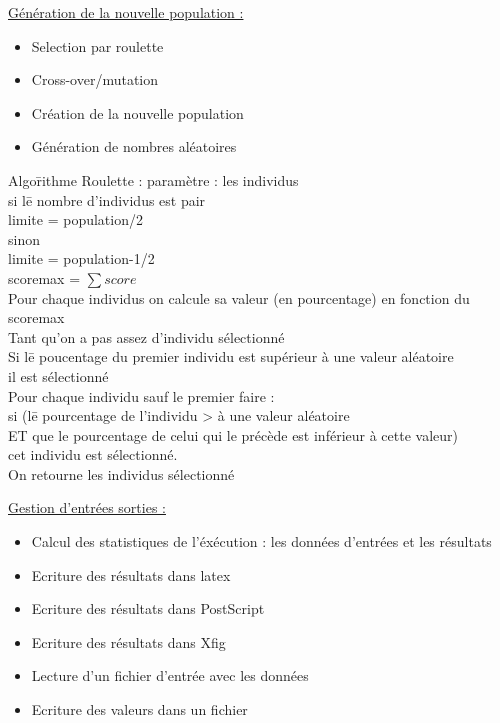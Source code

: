 \documentclass[a4paper,11pt]{article}
\begin{document}
		\underline{Génération de la nouvelle population : }
		\begin{itemize}
			\item Selection par roulette
			\item Cross-over/mutation
			\item Création de la nouvelle population
			\item Génération de nombres aléatoires
		\end{itemize}
		\begin{tabbing} 
		Algo\=rithme Roulette : paramètre : les individus\\
			\>si l\=e nombre d’individus est pair\\
			\>	\>limite = population/2\\
			\>sinon\\
			\>	\>limite = population-1/2\\
			\>scoremax = $\sum score$\\
			\>Pour chaque individus on calcule sa valeur (en pourcentage) en fonction du scoremax\\
			\>Tant qu’on a pas assez d’individu sélectionné\\
			\>	\>Si l\=e poucentage du premier individu est supérieur à une valeur aléatoire\\
			\>	\>\>il est sélectionné\\
			\>	\>Pour chaque individu sauf le premier faire :\\
			\>	\>\>si (l\=e pourcentage de l'individu > à une valeur aléatoire\\ 
			\>	\>\>ET que le pourcentage de celui qui le précède est inférieur à cette valeur)\\
			\>	\>\>\>cet individu est sélectionné.\\
			\>On retourne les individus sélectionné
		\end{tabbing}

		\underline{Gestion d'entrées sorties : }
		\begin{itemize}
			\item Calcul des statistiques de l'éxécution : les données d'entrées et les résultats
			\item Ecriture des résultats dans latex
			\item Ecriture des résultats dans PostScript
			\item Ecriture des résultats dans Xfig
			\item Lecture d'un fichier d'entrée avec les données
			\item Ecriture des valeurs dans un fichier\\
		\end{itemize}
		
\end{document}
